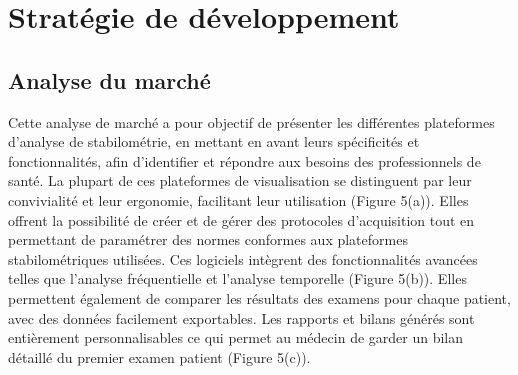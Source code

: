 \section{Stratégie de développement}


\subsection{Analyse du marché}

Cette analyse de marché a pour objectif de présenter les différentes 
plateformes d'analyse de stabilométrie, en mettant en avant leurs spécificités et 
fonctionnalités, afin d’identifier et répondre aux besoins des professionnels de 
santé. 
La plupart de ces plateformes de visualisation se distinguent par leur 
convivialité et leur ergonomie, facilitant leur utilisation (Figure 5(a)).  
Elles offrent la possibilité de créer et de gérer des protocoles d’acquisition 
tout en permettant de paramétrer des normes conformes aux plateformes 
stabilométriques utilisées. Ces logiciels intègrent des fonctionnalités avancées 
telles que l’analyse fréquentielle et l’analyse temporelle (Figure 5(b)). Elles 
permettent également de comparer les résultats des examens pour chaque patient, 
avec des données facilement exportables. Les rapports et bilans générés sont 
entièrement personnalisables ce qui permet au médecin de garder un bilan détaillé 
du premier examen patient (Figure 5(c)).

